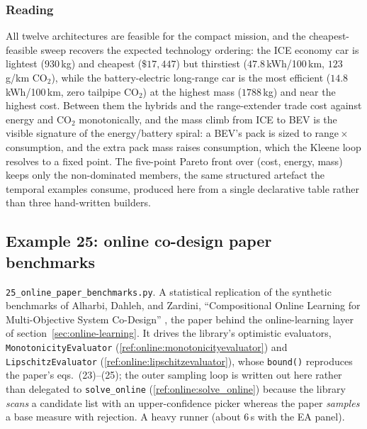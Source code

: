 \documentclass[11pt,a4paper]{article}
\begin{document}
\subsubsection*{Reading}
All twelve architectures are feasible for the compact mission, and the
cheapest-feasible sweep recovers the expected technology ordering: the ICE
economy car is lightest ($930$\,kg) and cheapest ($\$17{,}447$) but
thirstiest ($47.8$\,kWh/100\,km, $123$\,g/km CO$_2$), while the
battery-electric long-range car is the most efficient ($14.8$\,kWh/100\,km,
zero tailpipe CO$_2$) at the highest mass ($1788$\,kg) and near the highest
cost. Between them the hybrids and the range-extender trade cost against
energy and CO$_2$ monotonically, and the mass climb from ICE to BEV is the
visible signature of the energy/battery spiral: a BEV's pack is sized to
range\,$\times$\,consumption, and the extra pack mass raises consumption,
which the Kleene loop resolves to a fixed point. The five-point Pareto
front over (cost, energy, mass) keeps only the non-dominated members, the
same structured artefact the temporal examples consume, produced here from
a single declarative table rather than three hand-written builders.

\subsection{Example 25: online co-design paper benchmarks}
\label{ex:25}

\texttt{25\_online\_paper\_benchmarks.py}. A statistical replication of
the synthetic benchmarks of Alharbi, Dahleh, and Zardini, ``Compositional
Online Learning for Multi-Objective System Co-Design''
\citep{alharbi2026online}, the paper behind the online-learning layer of
section~\ref{sec:online-learning}. It drives the library's optimistic
evaluators, \texttt{MonotonicityEvaluator}
(\ref{ref:online:monotonicityevaluator}) and
\texttt{LipschitzEvaluator} (\ref{ref:online:lipschitzevaluator}), whose
\texttt{bound()} reproduces the paper's eqs.~(23)--(25); the outer
sampling loop is written out here rather than delegated to
\texttt{solve\_online} (\ref{ref:online:solve_online}) because the library
\emph{scans} a candidate list with an upper-confidence picker whereas the
paper \emph{samples} a base measure with rejection. A heavy runner (about
6\,s with the EA panel).
\end{document}
